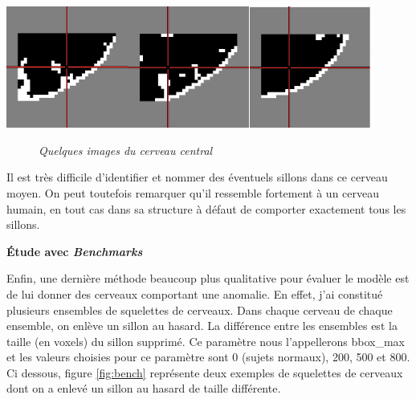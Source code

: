 \documentclass[12pt, oneside, a4paper, titlepage]{article}
\begin{document}
\vspace{0.5cm} 

\centerline{\includegraphics[width=4cm, height=4cm]{cervmoy1.png}\hspace{5mm}\includegraphics[width=4cm, height=4cm]{cervmoy12.png}\hspace{5mm}\includegraphics[width=4cm, height=4cm]{cervmoy13.png}}
\begin{figure}[H]
    \centering
    \caption{\textit{Quelques images du cerveau central}}
    \label{fig:cerv_centre}
\end{figure}

Il est très difficile d'identifier et nommer des éventuels sillons dans ce cerveau moyen. On peut toutefois remarquer qu'il ressemble fortement à un cerveau humain, en tout cas dans sa structure à défaut de comporter exactement tous les sillons.\\

\vspace{1mm}

\textbf{Étude avec \textit{Benchmarks}}\\

\vspace{1mm}

Enfin, une dernière méthode beaucoup plus qualitative pour évaluer le modèle est de lui donner des cerveaux comportant une anomalie. En effet, j'ai constitué plusieurs ensembles de squelettes de cerveaux.
Dans chaque cerveau de chaque ensemble, on enlève un sillon au hasard. La différence entre les ensembles est la taille (en voxels) du sillon supprimé. Ce paramètre nous l'appellerons bbox\_max et les valeurs choisies pour ce paramètre sont {0 (sujets normaux), 200, 500 et 800}.
Ci dessous, figure \ref{fig:bench} représente deux exemples de squelettes de cerveaux dont on a enlevé un sillon au hasard de taille différente.
\end{document}
